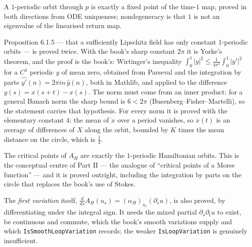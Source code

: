 \begin{definition}
  \label{def:6.1}
  \leanok
  A $1$-periodic orbit through $p$ is exactly a fixed point of the time-$1$ map,
  proved in both directions from ODE uniqueness; nondegeneracy is that $1$ is not
  an eigenvalue of the linearised return map.

  Proposition 6.1.5 --- that a sufficiently Lipschitz field has only constant
  $1$-periodic orbits --- is proved twice.  With the book's sharp constant
  $2\pi$ it is Yorke's theorem, and the proof is the book's: Wirtinger's
  inequality $\int_0^1 |y|^2 \le \tfrac{1}{4\pi^2} \int_0^1 |y'|^2$ for a
  $C^1$ periodic $y$ of mean zero, obtained from Parseval and the integration by
  parts $\widehat{y'}(n) = 2\pi i n\,\hat y(n)$, both in Mathlib, and applied
  to the difference $y(s) = x(s+t) - x(s)$.  The norm must come from an inner
  product: for a general Banach norm the sharp bound is $6 < 2\pi$
  (Busenberg--Fisher--Martelli), so the statement carries that hypothesis.  For
  every norm it is proved with the elementary constant $4$: the mean of $\dot x$
  over a period vanishes, so $\dot x(t)$ is an average of differences of $X$
  along the orbit, bounded by $K$ times the mean distance on the circle, which is
  $\tfrac14$.
\end{definition}

\begin{proposition}
  \label{prop:6.3.4}
  \leanok
  The critical points of $A_H$ are exactly the $1$-periodic Hamiltonian orbits.
  This is the conceptual centre of Part II --- the analogue of ``critical points
  of a Morse function'' --- and it is proved outright, including the integration
  by parts on the circle that replaces the book's use of Stokes.

  The \emph{first variation} itself, $\tfrac{d}{ds}A_H(u_s) = (\alpha_H)_{u_s}
  (\partial_s u)$, is also proved, by differentiating under the integral sign.
  It needs the mixed partial $\partial_s\partial_t u$ to exist, be continuous
  and commute, which the book's smooth variations supply and which
  \texttt{IsSmoothLoopVariation} records; the weaker
  \texttt{IsLoopVariation} is genuinely insufficient.
\end{proposition}

